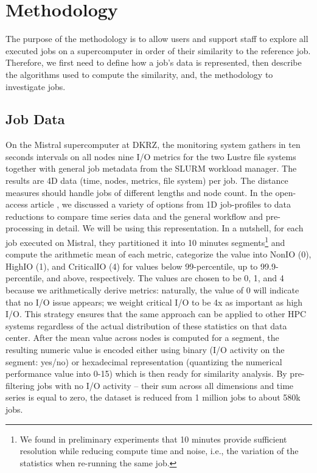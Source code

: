 \documentclass{jhps}
\begin{document}
\section{Methodology}
\label{sec:methodology}

The purpose of the methodology is to allow users and support staff to explore all executed jobs on a supercomputer in order of their similarity to the reference job.
Therefore, we first need to define how a job's data is represented, then describe the algorithms used to compute the similarity, and, the methodology to investigate jobs.

\subsection{Job Data}
On the Mistral supercomputer at DKRZ, the monitoring system \cite{betke20} gathers in ten seconds intervals on all nodes nine I/O metrics for the two Lustre file systems together with general job metadata from the SLURM workload manager.
The results are 4D data (time, nodes, metrics, file system) per job.
The distance measures should handle jobs of different lengths and node count.
In the open-access article \cite{Eugen20HPS}, we discussed a variety of options from 1D job-profiles to data reductions to compare time series data and the general workflow and pre-processing in detail. 
We will be using this representation.
In a nutshell, for each job executed on Mistral, they partitioned it into 10 minutes segments\footnote{We found in preliminary experiments that 10 minutes provide sufficient resolution while reducing compute time and noise, i.e., the variation of the statistics when re-running the same job.} and compute the arithmetic mean of each metric, categorize the value into NonIO (0), HighIO (1), and CriticalIO (4) for values below 99-percentile, up to 99.9-percentile, and above, respectively. 
The values are chosen to be 0, 1, and 4 because we arithmetically derive metrics: naturally, the value of 0 will indicate that no I/O issue appears; we weight critical I/O to be 4x as important as high I/O.
This strategy ensures that the same approach can be applied to other HPC systems regardless of the actual distribution of these statistics on that data center.
After the mean value across nodes is computed for a segment, the resulting numeric value is encoded either using binary (I/O activity on the segment: yes/no) or hexadecimal representation (quantizing the numerical performance value into 0-15) which is then ready for similarity analysis.
By pre-filtering jobs with no I/O activity -- their sum across all dimensions and time series is equal to zero, the dataset is reduced from 1 million jobs to about 580k jobs.
\end{document}
